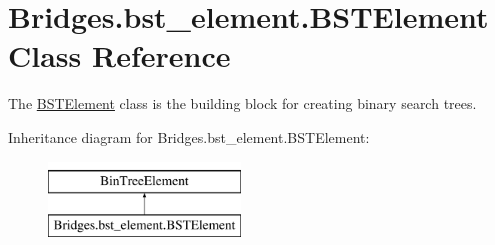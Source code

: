 \hypertarget{class_bridges_1_1bst__element_1_1_b_s_t_element}{}\section{Bridges.\+bst\+\_\+element.\+B\+S\+T\+Element Class Reference}
\label{class_bridges_1_1bst__element_1_1_b_s_t_element}


The \hyperlink{class_bridges_1_1bst__element_1_1_b_s_t_element}{B\+S\+T\+Element} class is the building block for creating binary search trees.  


Inheritance diagram for Bridges.\+bst\+\_\+element.\+B\+S\+T\+Element\+:\begin{figure}[H]
\begin{center}
\leavevmode
\includegraphics[height=2.000000cm]{class_bridges_1_1bst__element_1_1_b_s_t_element}
\end{center}
\end{figure}
